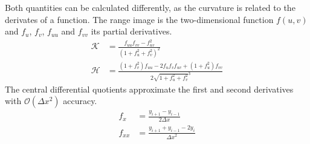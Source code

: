Both quantities can be calculated differently, as the curvature is related to the derivates of a function.
The range image is the two-dimensional function $f(u, v)$ and $f_u$, $f_v$, $f_{uu}$ and $f_{vv}$ its partial derivatives.
\begin{equation}
\begin{aligned}
    \mathcal{K} &= \frac{f_{uu} f_{vv} - f_{uv}^2}{{(1 + f_u^2 + f_v^2)}^2} \\
    \mathcal{H} &= \frac{{(1 + f_{v}^2)} f_{uu} - 2 f_u f_v f_{uv} + {(1 + f_u^2)} f_{vv}}{2 \sqrt{1 + f_u^2 + f_v^2}^3}
\end{aligned}
\end{equation}
The central differential quotients approximate the first and second derivatives with $\mathcal{O}(\Delta x^2)$ accuracy.
\begin{align*}
    f_{x} &= \frac{y_{i+1} - y_{i-1}}{2 \Delta x} \\
    f_{xx} &= \frac{y_{i+1} + y_{i-1} - 2 y_{i}}{{\Delta x}^2}
\end{align*}

